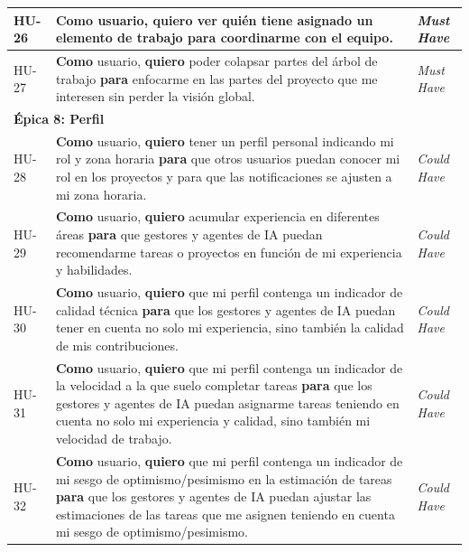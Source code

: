 \begin{longtable}{|p{1.5cm}|p{9cm}|p{3cm}|}
HU-26 &
\textbf{Como} usuario, \textbf{quiero} ver quién tiene asignado un elemento de trabajo \textbf{para} coordinarme con el equipo.
& \emph{Must Have} \\
\hline

HU-27 &
\textbf{Como} usuario, \textbf{quiero} poder colapsar partes del árbol de trabajo \textbf{para} enfocarme en las partes del proyecto que me interesen sin perder la visión global.
& \emph{Must Have} \\
\hline

\multicolumn{3}{|l|}{\cellcolor{gray!15}\textbf{Épica 8: Perfil}} \\
\hline

HU-28 &
\textbf{Como} usuario, \textbf{quiero} tener un perfil personal indicando mi rol y zona horaria
\textbf{para} que otros usuarios puedan conocer mi rol en los proyectos y para que las notificaciones se ajusten a mi zona horaria.
& \emph{Could Have} \\
\hline

HU-29 &
\textbf{Como} usuario, \textbf{quiero} acumular experiencia en diferentes áreas 
\textbf{para} que gestores y agentes de \ac{IA} puedan recomendarme tareas o proyectos en función de mi experiencia y habilidades.
& \emph{Could Have} \\
\hline

HU-30 &
\textbf{Como} usuario, \textbf{quiero} que mi perfil contenga un indicador de calidad técnica
\textbf{para} que los gestores y agentes de \ac{IA} puedan tener en cuenta no solo mi experiencia, sino también la calidad de mis contribuciones.
& \emph{Could Have} \\
\hline

HU-31 &
\textbf{Como} usuario, \textbf{quiero} que mi perfil contenga  un indicador de la velocidad a la que suelo completar tareas
\textbf{para} que los gestores y agentes de \ac{IA} puedan asignarme tareas teniendo en cuenta no solo mi experiencia y calidad, sino también mi velocidad de trabajo.
& \emph{Could Have} \\
\hline

HU-32 &
\textbf{Como} usuario, \textbf{quiero} que mi perfil contenga un indicador de mi sesgo de optimismo/pesimismo en la estimación de tareas
\textbf{para} que los gestores y agentes de \ac{IA} puedan ajustar las estimaciones de las tareas que me asignen teniendo en cuenta mi sesgo de optimismo/pesimismo.
& \emph{Could Have} \\
\hline

\end{longtable}
\endgroup


